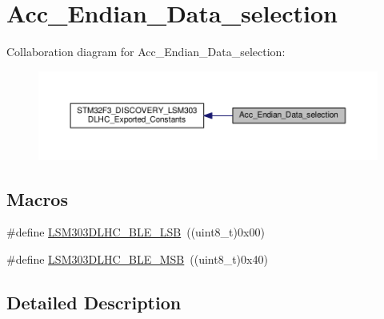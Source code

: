 \hypertarget{group__Acc__Endian__Data__selection}{\section{Acc\+\_\+\+Endian\+\_\+\+Data\+\_\+selection}
\label{group__Acc__Endian__Data__selection}
}
Collaboration diagram for Acc\+\_\+\+Endian\+\_\+\+Data\+\_\+selection\+:\nopagebreak
\begin{figure}[H]
\begin{center}
\leavevmode
\includegraphics[width=350pt]{group__Acc__Endian__Data__selection}
\end{center}
\end{figure}
\subsection*{Macros}
\begin{DoxyCompactItemize}
\item 
\#define \hyperlink{group__Acc__Endian__Data__selection_ga69f7833726fe44bdbef9fe76f954878b}{L\+S\+M303\+D\+L\+H\+C\+\_\+\+B\+L\+E\+\_\+\+L\+S\+B}~((uint8\+\_\+t)0x00)
\item 
\#define \hyperlink{group__Acc__Endian__Data__selection_ga124f8843208a39b5e1467fc119f7be51}{L\+S\+M303\+D\+L\+H\+C\+\_\+\+B\+L\+E\+\_\+\+M\+S\+B}~((uint8\+\_\+t)0x40)
\end{DoxyCompactItemize}


\subsection{Detailed Description}


